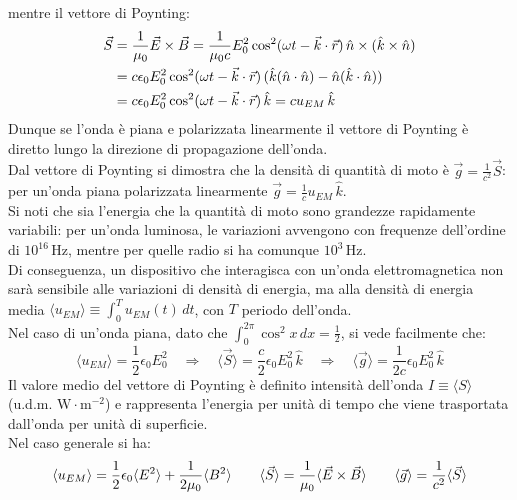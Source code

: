 \documentclass[]{article}
\begin{document}
mentre il vettore di Poynting:
\begin{equation}
	\begin{split}
		\vec{S} &= \frac{1}{\mu_0} \vec{E}\times\vec{B} = \frac{1}{\mu_0 c} E_0^2 \cos^2 (\omega t - \vec{k}\cdot\vec{r}) \,\hat{n}\times(\hat{k}\times\hat{n}) \\ 
			&= c \epsilon_0 E_0^2 \cos^2 (\omega t - \vec{k}\cdot\vec{r}) \, (\hat{k}(\hat{n}\cdot\hat{n}) - \hat{n}(\hat{k}\cdot\hat{n})) \\ 
			&= c \epsilon_0 E_0^2 \cos^2 (\omega t - \vec{k}\cdot\vec{r}) \,\hat{k} = c u_{EM} \,\hat{k}
	\end{split}
	\label{eq:41}
\end{equation}
Dunque se l'onda è piana e polarizzata linearmente il vettore di Poynting è diretto lungo la direzione di propagazione dell'onda. \\ 
%
Dal vettore di Poynting si dimostra che la densità di quantità di moto è $ \vec{g} = \frac{1}{c^2} \vec{S} $: per un'onda piana polarizzata linearmente $ \vec{g} = \frac{1}{c}u_{EM} \,\hat{k} $. \\ 
Si noti che sia l'energia che la quantità di moto sono grandezze rapidamente variabili: per un'onda luminosa, le variazioni avvengono con frequenze dell'ordine di $ 10^{16}\,\text{Hz} $, mentre per quelle radio si ha comunque $ 10^3\,\text{Hz} $. \\ 
Di conseguenza, un dispositivo che interagisca con un'onda elettromagnetica non sarà sensibile alle variazioni di densità di energia, ma alla densità di energia media $ \langle u_{EM} \rangle \equiv \int_0^T u_{EM}(t) \,dt $, con $ T $ periodo dell'onda. \\ 
%
Nel caso di un'onda piana, dato che $ \int_0^{2\pi} \cos^2 x\,dx = \frac{1}{2} $, si vede facilmente che:
\begin{equation}
	\langle u_{EM} \rangle = \frac{1}{2} \epsilon_0 E_0^2 \quad\Longrightarrow\quad \langle \vec{S} \rangle = \frac{c}{2} \epsilon_0 E_0^2 \,\hat{k} \quad\Longrightarrow\quad \langle \vec{g} \rangle = \frac{1}{2c} \epsilon_0 E_0^2 \,\hat{k}
	\label{eq:42}
\end{equation}
Il valore medio del vettore di Poynting è definito intensità dell'onda $ I \equiv \langle S \rangle $ (u.d.m. $ \text{W}\cdot\text{m}^{-2} $) e rappresenta l'energia per unità di tempo che viene trasportata dall'onda per unità di superficie. \\ 
%
Nel caso generale si ha:
\begin{equation}
	\langle u_{EM} \rangle = \frac{1}{2} \epsilon_0 \langle E^2 \rangle + \frac{1}{2\mu_0} \langle B^2 \rangle \qquad \langle \vec{S} \rangle = \frac{1}{\mu_0} \langle \vec{E}\times\vec{B} \rangle \qquad \langle \vec{g} \rangle = \frac{1}{c^2} \langle \vec{S} \rangle
	\label{eq:43}
\end{equation}
\end{document}
